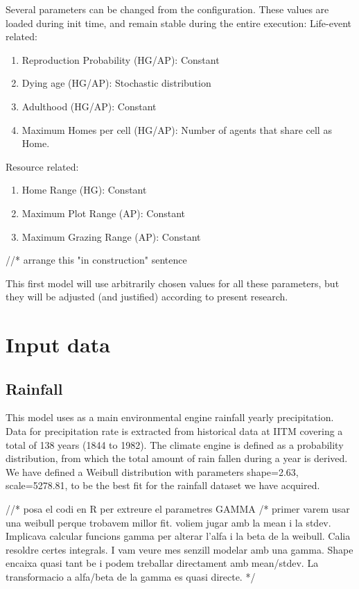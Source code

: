 Several parameters can be changed from the configuration. These values are loaded during init time,
and remain stable during the entire execution:
Life-event related:
\begin{enumerate}
\item Reproduction Probability (HG/AP): Constant
\item Dying age (HG/AP): Stochastic distribution
\item Adulthood (HG/AP): Constant
\item Maximum Homes per cell (HG/AP): Number of agents that share cell as Home.
\end{enumerate}

Resource related:
\begin{enumerate}
\item Home Range (HG): Constant
\item Maximum Plot Range (AP): Constant
\item Maximum Grazing Range (AP): Constant
\end{enumerate}

//* arrange this "in construction" sentence

This first model will use arbitrarily chosen values for all these parameters, but they will be adjusted
(and justified) according to present research.

\section{Input data}

\subsection{Rainfall}
This model uses as a main environmental engine rainfall yearly precipitation. Data for precipitation
rate is extracted from historical data at IITM covering a total of 138 years (1844 to 1982). The climate
engine is defined as a probability distribution, from which the total amount of rain fallen during a year
is derived. We have defined a Weibull distribution with parameters shape=2.63, scale=5278.81, to be
the best fit for the rainfall dataset we have acquired.

//* posa el codi en R per extreure el parametres GAMMA
/*
primer varem usar una weibull perque trobavem millor fit.
voliem jugar amb la mean i la stdev. Implicava calcular funcions gamma per alterar
l'alfa i la beta de la weibull. Calia resoldre certes integrals. I vam veure mes senzill
modelar amb una gamma. Shape encaixa quasi tant be i podem treballar directament
amb mean/stdev. La transformacio a alfa/beta de la gamma es quasi directe.
*/

